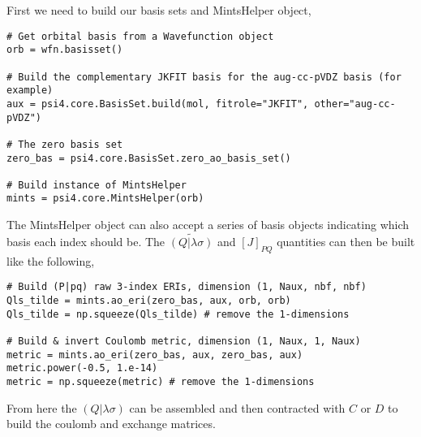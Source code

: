 \documentclass[aip,jcp,preprint,superscriptaddress,floatfix]{revtex4-1}
\begin{document}
First we need to build our basis sets and MintsHelper object,
\begin{verbatim}
# Get orbital basis from a Wavefunction object
orb = wfn.basisset()

# Build the complementary JKFIT basis for the aug-cc-pVDZ basis (for example)
aux = psi4.core.BasisSet.build(mol, fitrole="JKFIT", other="aug-cc-pVDZ")

# The zero basis set
zero_bas = psi4.core.BasisSet.zero_ao_basis_set()

# Build instance of MintsHelper
mints = psi4.core.MintsHelper(orb)
\end{verbatim}

The MintsHelper object can also accept a series of basis objects indicating which basis each index should be.
The $\widetilde{(Q| \lambda \sigma)} $ and $[J]_{PQ} $ quantities can then be built like the following,
\begin{verbatim}
# Build (P|pq) raw 3-index ERIs, dimension (1, Naux, nbf, nbf)
Qls_tilde = mints.ao_eri(zero_bas, aux, orb, orb)
Qls_tilde = np.squeeze(Qls_tilde) # remove the 1-dimensions

# Build & invert Coulomb metric, dimension (1, Naux, 1, Naux)
metric = mints.ao_eri(zero_bas, aux, zero_bas, aux)
metric.power(-0.5, 1.e-14)
metric = np.squeeze(metric) # remove the 1-dimensions
\end{verbatim}

From here the $(Q| \lambda \sigma)$ can be assembled and then contracted with $C$ or $D$ to build the coulomb and exchange matrices.



\end{document}
